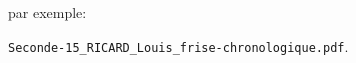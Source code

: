 \documentclass[a4paper]{article}
\newlength{\stextwidth} %
\newcommand{\guess}[1]{\ifthenelse{\boolean{reveal}}{{\color{red}#1}}{\settowidth{\stextwidth}{#1}\makebox[\stextwidth]{\dotfill}}}
\begin{document}
par exemple:

\begin{center}
  \verb|Seconde-15_RICARD_Louis_frise-chronologique.pdf|.
\end{center}

%
%
%
%
%
%
%
%
\end{document}
